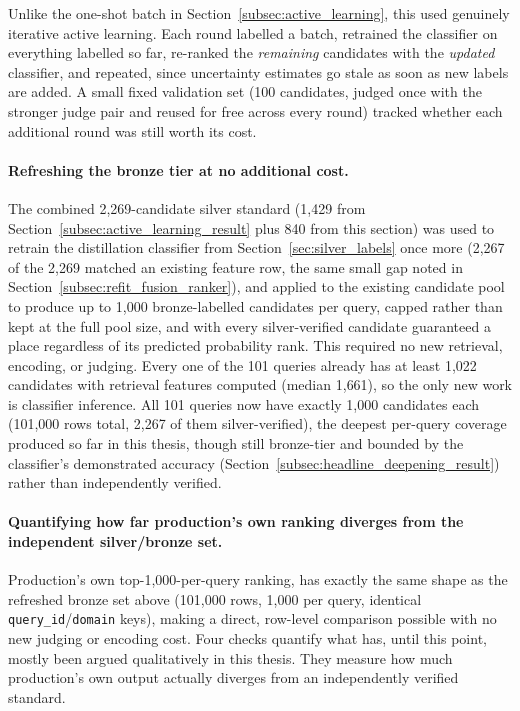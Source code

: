 \documentclass[a4paper,oneside,bibliography=totoc]{scrbook}
\begin{document}
Unlike the one-shot batch in Section~\ref{subsec:active_learning}, this used genuinely iterative active learning. Each round labelled a batch, retrained the classifier on everything labelled so far, re-ranked the \emph{remaining} candidates with the \emph{updated} classifier, and repeated, since uncertainty estimates go stale as soon as new labels are added. A small fixed validation set (100 candidates, judged once with the stronger judge pair and reused for free across every round) tracked whether each additional round was still worth its cost.

\paragraph{Refreshing the bronze tier at no additional cost.} The combined 2{,}269-candidate silver standard (1{,}429 from Section~\ref{subsec:active_learning_result} plus 840 from this section) was used to retrain the distillation classifier from Section~\ref{sec:silver_labels} once more (2{,}267 of the 2{,}269 matched an existing feature row, the same small gap noted in Section~\ref{subsec:refit_fusion_ranker}), and applied to the existing candidate pool to produce up to 1{,}000 bronze-labelled candidates per query, capped rather than kept at the full pool size, and with every silver-verified candidate guaranteed a place regardless of its predicted probability rank. This required no new retrieval, encoding, or judging. Every one of the 101 queries already has at least 1{,}022 candidates with retrieval features computed (median 1{,}661), so the only new work is classifier inference. All 101 queries now have exactly 1{,}000 candidates each (101{,}000 rows total, 2{,}267 of them silver-verified), the deepest per-query coverage produced so far in this thesis, though still bronze-tier and bounded by the classifier's demonstrated accuracy (Section~\ref{subsec:headline_deepening_result}) rather than independently verified.

\paragraph{Quantifying how far production's own ranking diverges from the independent silver/bronze set.}
\label{subsec:production_divergence}

Production's own top-1{,}000-per-query ranking, has exactly the same shape as the refreshed bronze set above (101{,}000 rows, 1{,}000 per query, identical \texttt{query\_id}/\texttt{domain} keys), making a direct, row-level comparison possible with no new judging or encoding cost. Four checks quantify what has, until this point, mostly been argued qualitatively in this thesis. They measure how much production's own output actually diverges from an independently verified standard.
\end{document}
